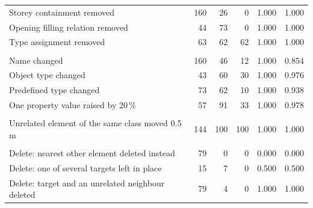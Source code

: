 \begin{tabular}{lrrrrr}
Storey containment removed & 160 & 26 & 0 & 1.000 & 1.000 \\
Opening filling relation removed & 44 & 73 & 0 & 1.000 & 1.000 \\
Type assignment removed & 63 & 62 & 62 & 1.000 & 1.000 \\
\addlinespace
\multicolumn{6}{l}{\textit{Attribute}} \\
Name changed & 160 & 46 & 12 & 1.000 & 0.854 \\
Object type changed & 43 & 60 & 30 & 1.000 & 0.976 \\
Predefined type changed & 73 & 62 & 10 & 1.000 & 0.938 \\
One property value raised by 20\,\% & 57 & 91 & 33 & 1.000 & 0.978 \\
\addlinespace
\multicolumn{6}{l}{\textit{Outside the target}} \\
Unrelated element of the same class moved 0.5\,m & 144 & 100 & 100 & 1.000 & 1.000 \\
\addlinespace
\multicolumn{6}{l}{\textit{Deletion}} \\
Delete: nearest other element deleted instead & 79 & 0 & 0 & 0.000 & 0.000 \\
Delete: one of several targets left in place & 15 & 7 & 0 & 0.500 & 0.500 \\
Delete: target and an unrelated neighbour deleted & 79 & 4 & 0 & 1.000 & 1.000 \\
\bottomrule
\end{tabular}
